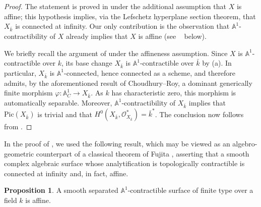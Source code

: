 \documentclass[10pt]{amsart}
\renewcommand{\AA}{\mathbb{A}}
\numberwithin{equation}{section} %
\theoremstyle{plain}
\theoremstyle{definition}
\newtheorem{prop}[prop]{Proposition}
\theoremstyle{remark}
\begin{document}
\begin{proof}
The statement is proved in \cite{choudhury2024} under the additional assumption that $X$ is affine; this hypothesis implies, via the Lefschetz hyperplane section theorem, that $X_{\bar{k}}$ is connected at infinity. Our only contribution is the observation that $\AA^1$-contractibility of $X$ already implies that $X$ is affine (see ~ below). 
\medskip

We briefly recall the argument of \cite{choudhury2024} under the affineness assumption. Since $X$ is $\AA^1$-contractible over $k$, its base change $X_{\bar{k}}$ is $\AA^1$-contractible over $\bar{k}$ by (a). In particular, $X_{\bar{k}}$ is $\AA^1$-connected, hence connected as a scheme, and therefore admits, by the aforementioned result of Choudhury--Roy, a dominant generically finite morphism $\varphi:\AA^1_C\to X_{\bar{k}}$. As $k$ has characteristic zero, this morphism is automatically separable. Moreover, $\AA^1$-contractibility of $X_{\bar{k}}$ implies that $\mathrm{Pic}(X_{\bar{k}})$ is trivial and that $H^0(X_{\bar{k}},\mathcal{O}_{X_{\bar{k}}}^*)=\bar{k}^*$. The conclusion now follows from .
\end{proof}

In the proof of , we used the following result, which may be viewed as an algebro-geometric counterpart of a classical theorem of Fujita \cite[p.~512, Theorem, item~3]{fujita1982}, asserting that a smooth complex algebraic surface whose analytification is topologically contractible is connected at infinity and, in fact, affine.

\begin{prop} \label{prop:A1cont-implies-affine}
A smooth separated $\AA^1$-contractible surface of finite type over a field $k$ is affine.
\end{prop}
\end{document}
